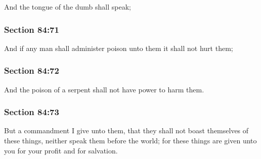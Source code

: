 		And the tongue of the dumb shall speak;


	\subsubsection{Section 84:71} %
		\label{DC84-71}

		And if any man shall administer poison unto them it shall not hurt them;


	\subsubsection{Section 84:72} %
		\label{DC84-72}

		And the poison of a serpent shall not have power to harm them.


	\subsubsection{Section 84:73} %
		\label{DC84-73}

		But a commandment I give unto them, that they shall not boast themselves of these things, neither speak them before the world; for these things are given unto you for your profit and for salvation.

